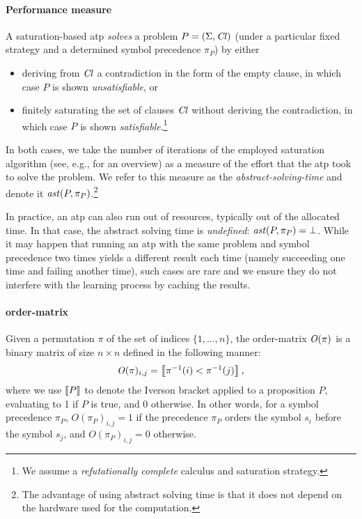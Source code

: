 \paragraph{Performance measure} A saturation-based \gls*{atp} \emph{solves} a problem \(P = (\operatorname{\Sigma},\operatorname{\mathit{Cl}})\)
(under a particular fixed strategy and a determined symbol precedence \(\pi_P\))  by either
\begin{itemize}
\item
	deriving from \(\operatorname{\mathit{Cl}}\) a contradiction in the form of the empty clause,
	in which case \(P\) is shown \emph{unsatisfiable}, or
\item
	finitely saturating the set of clauses \(\operatorname{\mathit{Cl}}\) without deriving the contradiction,
	in which case \(P\) is shown \emph{satisfiable}.\footnote{We assume a \emph{refutationally complete} calculus and saturation strategy.}	
\end{itemize}
In both cases, we take the number of iterations of the employed saturation algorithm (see, e.g., \citet{DBLP:journals/jsc/RiazanovV03} for an overview) 
as a measure of the effort that the \gls*{atp} took to solve the problem.
We refer to this measure as the \emph{\gls*{abstract-solving-time}} and denote it \(\operatorname{\mathit{ast}}(P,\pi_P)\).\footnote{The advantage of using abstract solving time is that it does not depend on the hardware used for the computation.}

In practice, an \gls*{atp} can also run out of resources, typically out of the allocated time.
In that case, the abstract solving time is \emph{undefined}: \(\operatorname{\mathit{ast}}(P,\pi_P) = \bot\).
%
While it may happen that running an \gls*{atp} with the same problem and symbol precedence two times
yields a different result each time (namely succeeding one time and failing another time),
such cases are rare and we ensure they do not interfere with the learning process by caching the results.


\paragraph{\Gls*{order-matrix}}
Given a permutation \(\pi\) of the set of indices \(\{1,\ldots,n\}\),
the \gls*{order-matrix} \(\operatorname{\mathit{O}}(\pi)\) is a binary matrix of size \(n \times n\)
defined in the following manner:
\begin{align*}
\operatorname{\mathit{O}}(\pi)_{i, j} = \left \llbracket \pi^{-1}(i) < \pi^{-1}(j) \right \rrbracket,
\end{align*}
where we use \(\left \llbracket P \right \rrbracket\) to denote the Iverson bracket \cite{Iverson1962} applied to a proposition \(P\),
evaluating to 1 if \(P\) is true, and 0 otherwise.
In other words, for a symbol precedence \(\pi_P\), \(O(\pi_P)_{i, j} = 1\) if
the precedence \(\pi_P\) orders the symbol \(s_i\) before the symbol \(s_j\),
and \(O(\pi_P)_{i, j} = 0\) otherwise.

